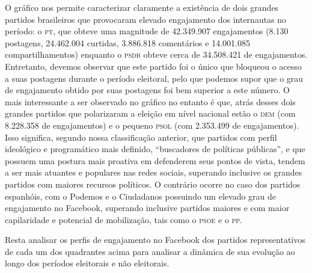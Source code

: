 O gráfico nos permite caracterizar claramente a existência de dois
grandes partidos brasileiros que provocaram elevado engajamento dos
internautas no período: o \textsc{pt}, que obteve uma magnitude de 42.349.907
engajamentos (8.130 postagens, 24.462.004 curtidas, 3.886.818
comentários e 14.001.085 compartilhamentos) enquanto o \textsc{psdb} obteve cerca
de 34.508.421 de engajamentos. Entretanto, devemos observar que este
partido foi o único que bloqueou o acesso a suas postagens durante o
período eleitoral, pelo que podemos supor que o grau de engajamento
obtido por suas postagens foi bem superior a este número. O mais
interessante a ser observado no gráfico no entanto é que, atrás desses
dois grandes partidos que polarizaram a eleição em nível nacional estão
o \textsc{dem} (com 8.228.358 de engajamentos) e o pequeno \textsc{psol} (com 2.353.499 de
engajamentos). Isso significa, segundo nossa classificação anterior, que
partidos com perfil ideológico e programático mais definido,
``buscadores de políticas públicas'', e que possuem uma postura mais
proativa em defenderem seus pontos de vista, tendem a ser mais atuantes
e populares nas redes sociais, superando inclusive os grandes partidos
com maiores recursos políticos. O contrário ocorre no caso dos partidos
espanhóis, com o Podemos e o Ciudadanos possuindo um elevado grau de
engajamento no Facebook, superando inclusive partidos maiores e com
maior capilaridade e potencial de mobilização, tais como o \textsc{psoe} e o \textsc{pp}.

Resta analisar os perfis de engajamento no Facebook dos partidos
representativos de cada um dos quadrantes acima para analisar a dinâmica
de sua evolução ao longo dos períodos eleitorais e não eleitorais.

